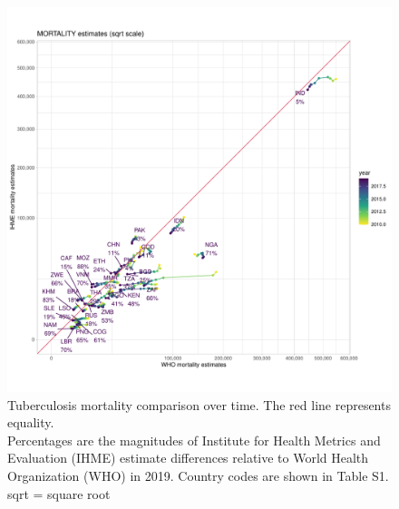 \documentclass[12pt]{article}
\begin{document}
\FloatBarrier

\begin{figure}
  \centering
  \includegraphics[width=1\textwidth]{../plots/aF2b.pdf}
  \caption[Mortality comparison over time]{Tuberculosis mortality comparison over time. The
    red line represents equality. \\ Percentages are the magnitudes of Institute for Health Metrics
    and Evaluation (IHME) estimate differences
    relative to World Health Organization (WHO) in 2019. Country codes are shown
    in Table S1. sqrt = square root}
\end{figure}

\FloatBarrier
\end{document}
